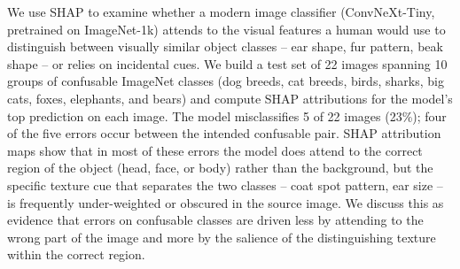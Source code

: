 We use SHAP to examine whether a modern image classifier
(ConvNeXt-Tiny, pretrained on ImageNet-1k) attends to the visual features a
human would use to distinguish between visually similar object classes --
ear shape, fur pattern, beak shape -- or relies on incidental cues. We build
a test set of 22 images spanning 10 groups of confusable ImageNet classes
(dog breeds, cat breeds, birds, sharks, big cats, foxes, elephants, and
bears) and compute SHAP attributions for the model's top prediction on each
image. The model misclassifies 5 of 22 images (23\%); four of the five
errors occur between the intended confusable pair. SHAP attribution maps
show that in most of these errors the model does attend to the correct
region of the object (head, face, or body) rather than the background, but
the specific texture cue that separates the two classes -- coat spot
pattern, ear size -- is frequently under-weighted or obscured in the source
image. We discuss this as evidence that errors on confusable classes are
driven less by attending to the wrong part of the image and more by the
salience of the distinguishing texture within the correct region.
